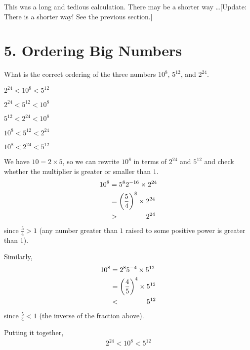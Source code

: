 \documentclass[12pt]{article}
\begin{document}

This was a long and tedious calculation. There may be a shorter way \ldots [Update: There is a shorter way! See the previous section.]





\newpage
\section*{5. Ordering Big Numbers}
\begin{question}
What is the correct ordering of the three numbers $10^{8}$, $5^{12}$, and $2^{24}$.
\begin{enumerate*}
  \item $2^{24} < 10^{8} < 5^{12}$
  \item $2^{24} < 5^{12} < 10^{8}$
  \item $5^{12} < 2^{24} < 10^{8}$
  \item $10^{8} < 5^{12} < 2^{24}$
  \item $10^{8} < 2^{24} < 5^{12}$
\end{enumerate*}
\end{question}

We have $10 = 2 \times 5$, so we can rewrite $10^{8}$ in terms of $2^{24}$ and $5^{12}$ and check whether the multiplier is greater or smaller than $1$.
\begin{align*}
10^{8} & = 5^{8}2^{-16} \times 2^{24} \\
       & = \left(\frac{5}{4}\right)^{8} \times 2^{24} \\
       & > \hspace{3.9em} 2^{24}
\end{align*}
since $\frac{5}{4}>1$ (any number greater than $1$ raised to some positive power is greater than $1$). 

Similarly,
\begin{align*}
10^{8} & = 2^{8}5^{-4} \times 5^{12} \\
       & = \left(\frac{4}{5}\right)^{4} \times 5^{12} \\
       & < \hspace{3.9em} 5^{12}
\end{align*}
since $\frac{5}{4}<1$ (the inverse of the fraction above). 


Putting it together,
\begin{align*}
2^{24} < 10^{8} < 5^{12}
\end{align*}

\end{document}
